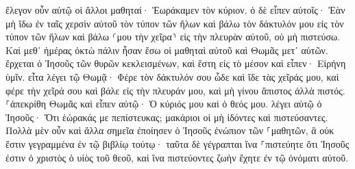 \documentclass[twoside, 9pt]{extreport}
\begin{document}
ἔλεγον οὖν αὐτῷ οἱ ἄλλοι μαθηταί· Ἑωράκαμεν τὸν κύριον. ὁ δὲ εἶπεν αὐτοῖς· Ἐὰν μὴ ἴδω ἐν ταῖς χερσὶν αὐτοῦ τὸν τύπον τῶν ἥλων καὶ βάλω τὸν δάκτυλόν μου εἰς τὸν τύπον τῶν ἥλων καὶ βάλω ⸂μου τὴν χεῖρα⸃ εἰς τὴν πλευρὰν αὐτοῦ, οὐ μὴ πιστεύσω. 
Καὶ μεθ᾽ ἡμέρας ὀκτὼ πάλιν ἦσαν ἔσω οἱ μαθηταὶ αὐτοῦ καὶ Θωμᾶς μετ᾽ αὐτῶν. ἔρχεται ὁ Ἰησοῦς τῶν θυρῶν κεκλεισμένων, καὶ ἔστη εἰς τὸ μέσον καὶ εἶπεν· Εἰρήνη ὑμῖν. 
εἶτα λέγει τῷ Θωμᾷ· Φέρε τὸν δάκτυλόν σου ὧδε καὶ ἴδε τὰς χεῖράς μου, καὶ φέρε τὴν χεῖρά σου καὶ βάλε εἰς τὴν πλευράν μου, καὶ μὴ γίνου ἄπιστος ἀλλὰ πιστός. 
⸀ἀπεκρίθη Θωμᾶς καὶ εἶπεν αὐτῷ· Ὁ κύριός μου καὶ ὁ θεός μου. 
λέγει αὐτῷ ὁ Ἰησοῦς· Ὅτι ἑώρακάς με πεπίστευκας; μακάριοι οἱ μὴ ἰδόντες καὶ πιστεύσαντες. 
Πολλὰ μὲν οὖν καὶ ἄλλα σημεῖα ἐποίησεν ὁ Ἰησοῦς ἐνώπιον τῶν ⸀μαθητῶν, ἃ οὐκ ἔστιν γεγραμμένα ἐν τῷ βιβλίῳ τούτῳ· 
ταῦτα δὲ γέγραπται ἵνα ⸀πιστεύητε ὅτι Ἰησοῦς ἐστιν ὁ χριστὸς ὁ υἱὸς τοῦ θεοῦ, καὶ ἵνα πιστεύοντες ζωὴν ἔχητε ἐν τῷ ὀνόματι αὐτοῦ. 
\end{document}
